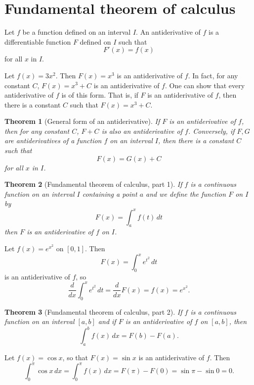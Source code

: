 \documentclass{article}
\theoremstyle{plain}
\newtheorem{theorem}{Theorem}
\begin{document}
\section{Fundamental theorem of calculus}
\begin{definition}[Antiderivative]
	Let $f$ be a function defined on an interval $I$.
	An antiderivative of $f$ is a differentiable function $F$ defined on $I$ such that
	\begin{equation}
		F'(x) = f(x)
	\end{equation}
	for all $x$ in $I$.
\end{definition}
\begin{example}
	Let $f(x) = 3x^2$.
	Then $F(x) = x^3$ is an antiderivative of $f$.
	In fact, for any constant $C$, $F(x) = x^3 + C$ is an antiderivative of $f$.
	One can show that every antiderivative of $f$ is of this form.
	That is, if $F$ is an antiderivative of $f$, then there is a constant $C$ such that $F(x) = x^3 + C$.
\end{example}
\begin{theorem}[General form of an antiderivative]
	If $F$ is an antiderivative of $f$, then for any constant $C$, $F + C$ is also an antiderivative of $f$.
	Conversely, if $F,G$ are antiderivatives of a function $f$ on an interval $I$, then there is a constant $C$ such that
	\begin{equation}
		F(x) = G(x) + C
	\end{equation}
	for all $x$ in $I$.
\end{theorem}
\begin{theorem}[Fundamental theorem of calculus, part 1]
	If $f$ is a continuous function on an interval $I$ containing a point $a$ and we define the function $F$ on $I$ by
	\begin{equation}
		F(x) = \int_a^xf(t)\,dt
	\end{equation}
	then $F$ is an antiderivative of $f$ on $I$.
\end{theorem}
\begin{example}
	Let $f(x) = e^{x^2}$ on $[0,1]$.
	Then
	\begin{equation}
		F(x) = \int_0^x e^{t^2}\,dt
	\end{equation}
	is an antiderivative of $f$, so
	\begin{equation}
		\frac{d}{dx}\int_0^x e^{t^2}\,dt = \frac{d}{dx}F(x) = f(x) = e^{x^2}.
	\end{equation}
\end{example}
\begin{theorem}[Fundamental theorem of calculus, part 2]
	If $f$ is a continuous function on an interval $[a,b]$
	and if $F$ is an antiderivative of $f$ on $[a,b]$, then
	\begin{equation}
		\int_a^b f(x)\,dx = F(b) - F(a).
	\end{equation}
\end{theorem}
\begin{example}
	Let $f(x) = \cos x$, so that $F(x) = \sin x$ is an antiderivative of $f$.
	Then
	\begin{equation}
		\int_0^\pi \cos x\, dx = \int_0^\pi f(x)\,dx = F(\pi) - F(0) = \sin \pi - \sin 0 = 0.
	\end{equation}
\end{example}
\end{document}
